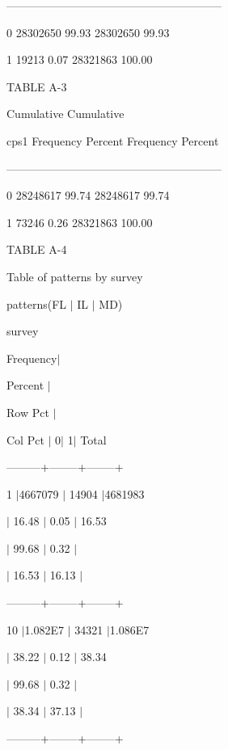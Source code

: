 \textsf{---------------------------------------------------------}

\textsf{0 28302650 99.93 28302650 99.93}

\textsf{1 19213 0.07 28321863 100.00}





\textsf{TABLE A-3}





\textsf{Cumulative Cumulative}

\textsf{cps1 Frequency Percent Frequency Percent}

\textsf{---------------------------------------------------------}

\textsf{0 28248617 99.74 28248617 99.74}

\textsf{1 73246 0.26 28321863 100.00}




\newpage 
\textsf{TABLE A-4}





\textsf{Table of patterns by survey}

\textsf{patterns(FL $\vert $ IL $\vert $ MD)}

\textsf{survey}

\textsf{Frequency$\vert $}

\textsf{Percent $\vert $}

\textsf{Row Pct $\vert $}

\textsf{Col Pct $\vert $ 0$\vert $ 1$\vert $ Total}

\textsf{---------+--------+--------+}

\textsf{1 $\vert $4667079 $\vert $ 14904 $\vert $4681983}

\textsf{$\vert $ 16.48 $\vert $ 0.05 $\vert $ 16.53}

\textsf{$\vert $ 99.68 $\vert $ 0.32 $\vert $}

\textsf{$\vert $ 16.53 $\vert $ 16.13 $\vert $}

\textsf{---------+--------+--------+}

\textsf{10 $\vert $1.082E7 $\vert $ 34321 $\vert $1.086E7}

\textsf{$\vert $ 38.22 $\vert $ 0.12 $\vert $ 38.34}

\textsf{$\vert $ 99.68 $\vert $ 0.32 $\vert $}

\textsf{$\vert $ 38.34 $\vert $ 37.13 $\vert $}

\textsf{---------+--------+--------+}

